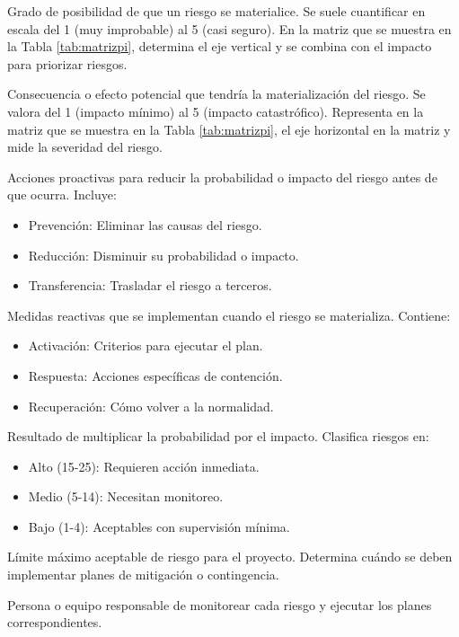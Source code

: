 \begin{description}[leftmargin=1cm, style=nextline]

\item[\textbf{Probabilidad}]
Grado de posibilidad de que un riesgo se materialice. Se suele cuantificar en escala del 1 (muy improbable) al 5 (casi seguro). En la matriz que se muestra en la Tabla \ref{tab:matrizpi}, determina el eje vertical y se combina con el impacto para priorizar riesgos.

\item[\textbf{Impacto}]
Consecuencia o efecto potencial que tendría la materialización del riesgo. Se valora del 1 (impacto mínimo) al 5 (impacto catastrófico). Representa en la matriz que se muestra en la Tabla \ref{tab:matrizpi}, el eje horizontal en la matriz y mide la severidad del riesgo.

\item[\textbf{Plan de Mitigación}]
Acciones proactivas para reducir la probabilidad o impacto del riesgo antes de que ocurra. Incluye:
\begin{itemize}
\item Prevención: Eliminar las causas del riesgo.
\item Reducción: Disminuir su probabilidad o impacto.
\item Transferencia: Trasladar el riesgo a terceros.
\end{itemize}

\item[\textbf{Plan de Contingencia}]
Medidas reactivas que se implementan cuando el riesgo se materializa. Contiene:
\begin{itemize}
\item Activación: Criterios para ejecutar el plan.
\item Respuesta: Acciones específicas de contención.
\item Recuperación: Cómo volver a la normalidad.
\end{itemize}

\item[\textbf{Nivel de Riesgo}]
Resultado de multiplicar la probabilidad por el impacto. Clasifica riesgos en:
\begin{itemize}
\item Alto (15-25): Requieren acción inmediata.
\item Medio (5-14): Necesitan monitoreo.
\item Bajo (1-4): Aceptables con supervisión mínima.
\end{itemize}

\item[\textbf{Umbral de Riesgo}]
Límite máximo aceptable de riesgo para el proyecto. Determina cuándo se deben implementar planes de mitigación o contingencia.

\item[\textbf{Propietario del Riesgo}]
Persona o equipo responsable de monitorear cada riesgo y ejecutar los planes correspondientes.

\end{description}


